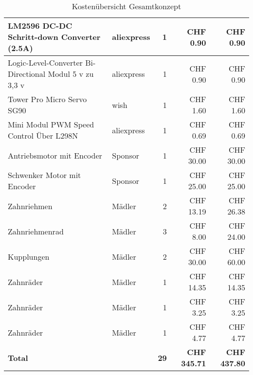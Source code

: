 \documentclass[../../main.tex]{subfiles}
\begin{document}
\begin{table}[H]
\begin{tabular}{|p{6cm}|l|r|r|r|}
    LM2596 DC-DC Schritt-down Converter (2.5A)              & aliexpress         & 1               & CHF 0.90            & CHF 0.90              \\ \hline
    Logic-Level-Converter Bi-Directional Modul 5 v zu 3,3 v & aliexpress         & 1               & CHF 0.90            & CHF 0.90              \\ \hline
    Tower Pro Micro Servo SG90                              & wish               & 1               & CHF 1.60            & CHF 1.60              \\ \hline
    Mini Modul PWM Speed Control Über L298N                 & aliexpress         & 1               & CHF 0.69            & CHF 0.69              \\ \hline
    Antriebsmotor mit Encoder                               & Sponsor            & 1               & CHF 30.00           & CHF 30.00             \\ \hline
    Schwenker Motor mit Encoder                             & Sponsor            & 1               & CHF 25.00           & CHF 25.00             \\ \hline
    Zahnriehmen                                             & Mädler             & 2               & CHF 13.19           & CHF 26.38             \\ \hline
    Zahnriehmenrad                                          & Mädler             & 3               & CHF 8.00            & CHF 24.00             \\ \hline
    Kupplungen                                              & Mädler             & 2               & CHF 30.00           & CHF 60.00             \\ \hline
    Zahnräder                                               & Mädler             & 1               & CHF 14.35           & CHF 14.35             \\ \hline
    Zahnräder                                               & Mädler             & 1               & CHF 3.25            & CHF 3.25              \\ \hline
    Zahnräder                                               & Mädler             & 1               & CHF 4.77            & CHF 4.77              \\ \hline \hline
    \textbf{Total}                                          & \textbf{}          & \textbf{29}     & \textbf{CHF 345.71} & \textbf{CHF 437.80}   \\ \hline
    \end{tabular}
    \caption{Kostenübersicht Gesamtkonzept}
    \label{tab:kosten_total}
    \end{table}
\end{document}
